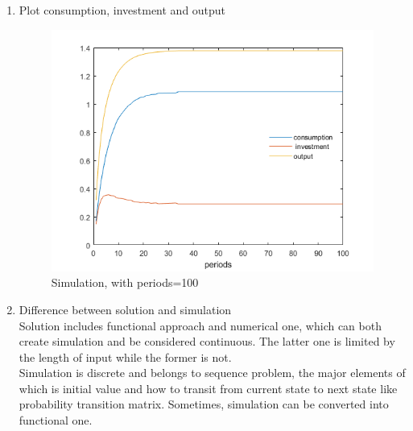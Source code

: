 \documentclass{article}
\begin{document}
\begin{enumerate}
        \begin{enumerate}
            \item Plot consumption, investment and output
            \begin{figure}[h!]
                \includegraphics[width=\linewidth]{6_3a.png}
                \caption{Simulation, with periods=100}
            \end{figure}
            \item Difference between solution and simulation\\
            Solution includes functional approach and numerical one, which can both create simulation and be considered continuous.
            The latter one is limited by the length of input while the former is not.\\
            Simulation is discrete and belongs to sequence problem, the major elements of which is initial value and how to transit from current state to next state like probability transition matrix.
            Sometimes, simulation can be converted into functional one.
        \end{enumerate}
    \end{enumerate}
\end{document}

